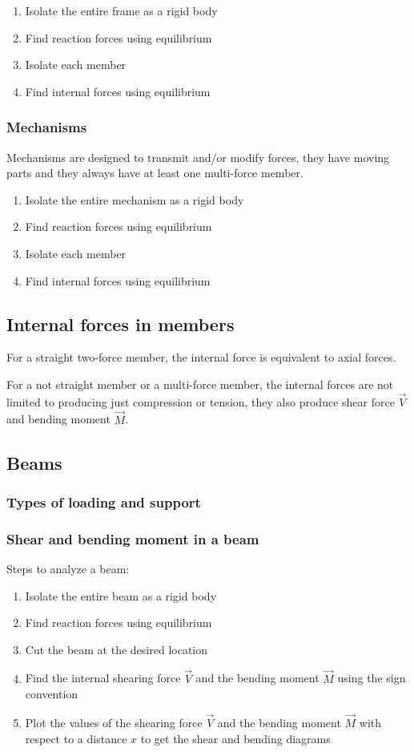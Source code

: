 \documentclass[10pt, twocolumn]{article}
\begin{document}
\begin{enumerate}
  \item Isolate the entire frame as a rigid body
  \item Find reaction forces using equilibrium
  \item Isolate each member
  \item Find internal forces using equilibrium
\end{enumerate}

\subsubsection{Mechanisms}
Mechanisms are designed to transmit and/or modify forces, they have moving parts and they always have at least one multi-force member.

\begin{enumerate}
  \item Isolate the entire mechanism as a rigid body
  \item Find reaction forces using equilibrium
  \item Isolate each member
  \item Find internal forces using equilibrium
\end{enumerate}

\subsection{Internal forces in members}
For a straight two-force member, the internal force is equivalent to axial forces.

For a not straight member or a multi-force member, the internal forces are not limited to producing just compression or tension, they also produce shear force \(\vec{V}\) and bending moment \(\vec{M}\).

\subsection{Beams}
\subsubsection{Types of loading and support}

\subsubsection{Shear and bending moment in a beam}
Steps to analyze a beam:
\begin{enumerate}
  \item Isolate the entire beam as a rigid body
  \item Find reaction forces using equilibrium
  \item Cut the beam at the desired location
  \item Find the internal shearing force \(\vec{V}\) and the bending moment \(\vec{M}\) using the sign convention
  \item Plot the values of the shearing force \(\vec{V}\) and the bending moment \(\vec{M}\) with respect to a distance \(x\) to get the shear and bending diagrams
\end{enumerate}
\end{document}
